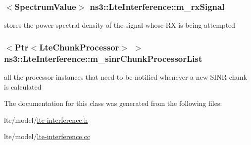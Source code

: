 \subsubsection[{\texorpdfstring{m\+\_\+rx\+Signal}{m_rxSignal}}]{$<${\bf Spectrum\+Value}$>$ ns3\+::\+Lte\+Interference\+::m\+\_\+rx\+Signal\hspace{0.3cm}{\ttfamily [private]}}\hypertarget{classns3_1_1LteInterference_a110c40dd295d66897ca93e4bcc947dfa}{}\label{classns3_1_1LteInterference_a110c40dd295d66897ca93e4bcc947dfa}
stores the power spectral density of the signal whose RX is being attempted 
\subsubsection[{\texorpdfstring{m\+\_\+sinr\+Chunk\+Processor\+List}{m_sinrChunkProcessorList}}]{$<${\bf Ptr}$<${\bf Lte\+Chunk\+Processor}$>$ $>$ ns3\+::\+Lte\+Interference\+::m\+\_\+sinr\+Chunk\+Processor\+List\hspace{0.3cm}{\ttfamily [private]}}\hypertarget{classns3_1_1LteInterference_ad2b739da02cfdfd8cb49fd34a5d95b7d}{}\label{classns3_1_1LteInterference_ad2b739da02cfdfd8cb49fd34a5d95b7d}
all the processor instances that need to be notified whenever a new S\+I\+NR chunk is calculated 

The documentation for this class was generated from the following files\+:\begin{DoxyCompactItemize}
\item 
lte/model/\hyperlink{lte-interference_8h}{lte-\/interference.\+h}\item 
lte/model/\hyperlink{lte-interference_8cc}{lte-\/interference.\+cc}\end{DoxyCompactItemize}
